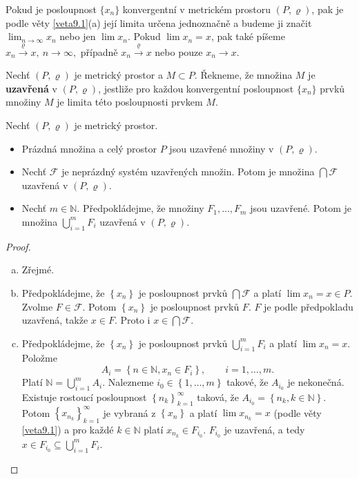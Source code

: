 \begin{oznaceni}
Pokud je posloupnost $\{x_n\}$ konvergentní v metrickém prostoru $(P,\varrho)$, pak je podle věty \ref{veta9.1}(a) její limita určena jednoznačně a budeme ji značit
$
\lim_{n\to\infty}x_n
$
nebo jen $\lim x_n$. Pokud $\lim x_n=x$, pak také píšeme
$
x_n \xrightarrow{\varrho} x,\ n\to\infty,
$
případně $x_n \xrightarrow{\varrho} x$ nebo pouze $x_n\to x$.
\end{oznaceni}

\begin{definice}
Nechť $(P,\varrho)$ je metrický prostor a $M\subset P$. Řekneme, že množina $M$ je \textbf{uzavřená} v $(P,\varrho)$,
jestliže pro každou konvergentní posloupnost $\{x_n\}$ prvků množiny $M$ je limita této posloupnosti prvkem $M$.
\end{definice}

\begin{veta} \label{veta9.2}
Nechť $(P,\varrho)$ je metrický prostor.

\begin{itemize}
    \item[(a)] Prázdná množina a celý prostor $P$ jsou uzavřené množiny v $(P,\varrho)$.

    \item[(b)] Nechť $\mathcal{F}$ je neprázdný systém uzavřených množin. Potom je množina
    $
    \bigcap \mathcal{F}
    $
    uzavřená v $(P,\varrho)$.

    \item[(c)] Nechť $m\in\mathbb{N}$. Předpokládejme, že množiny $F_1,\dots,F_m$ jsou uzavřené. Potom je množina
    $
    \bigcup_{i=1}^m F_i
    $
    uzavřená v $(P,\varrho)$.
\end{itemize}
\end{veta}

\begin{proof}\,
\begin{enumerate}[(a)]
	\item Zřejmé.
	\item Předpokládejme, že $\left \{ x_n \right \} $ je posloupnost prvků $\bigcap \mathcal F$
	a platí $\lim x_n= x \in P$. Zvolme $F \in \mathcal F$. Potom $\left \{ x_n \right \} $ je
	posloupnost prvků $F$. $F$ je podle předpokladu uzavřená, takže $x \in F$. Proto i $x \in \bigcap \mathcal F$.
	\item Předpokládejme, že $\left \{ x_n \right \} $ je posloupnost prvků $\bigcup _{i=1}^m F_i$
	a platí $\lim x_n=x$. Položme
	$$A_i = \left \{ n \in \mathbb N , x_n \in F_i \right \}, \qquad i=1,\dots,m. $$
	Platí $\mathbb N =\bigcup_{i=1}^m A_i$. Nalezneme $i_0\in \left \{ 1,\dots,m \right \} $
	takové, že $A_{i_0}$ je nekonečná. Existuje rostoucí posloupnost $\left \{ n_k \right \}_{k=1}^\infty $
	taková, že $A_{i_0}=\left \{ n_k, k \in \mathbb N  \right \} $. Potom $\left \{ x_{n_k} \right \}_{k=1}^\infty $
	je vybraná z $\left \{ x_n \right \} $ a platí $\lim x_{n_k} = x$ (podle věty \ref{veta9.1}) a
	pro každé $k \in \mathbb N $ platí $x_{n_k} \in F_{i_0}$. $F_{i_0}$ je uzavřená, a tedy
	$x \in F_{i_0} \subseteq \bigcup_{i=1}^m F_i$.\qedhere
\end{enumerate}
\end{proof}

